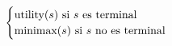 \documentclass[preview]{standalone}
\begin{document}
\begin{align*}
\begin{cases}\text{utility($s$) si $s$ es terminal} \cr
                                 \text{minimax($s$) si $s$ no es terminal} \cr
                                 \end{cases}
\end{align*}
\end{document}
